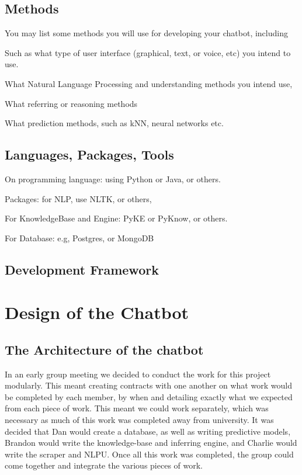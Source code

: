 \documentclass[11pt]{article}
\begin{document}
	\subsection{Methods}
	
	You may list some methods you will use for developing your chatbot, including 
	
	Such as what type of user interface (graphical, text, or voice, etc) you intend to use.
	
	What Natural Language Processing and understanding methods you intend use, 
	
	What referring or reasoning methods
	
	What prediction methods, such as kNN, neural networks etc. 
	
	\subsection{Languages, Packages, Tools}
	
	On programming language: using Python or Java, or others. 
	
	Packages: for NLP, use NLTK\citep{NLTK}, or others, 
	
	For KnowledgeBase and Engine: PyKE or PyKnow, or others. 
	
	For Database: e.g, Postgres, or MongoDB     
	
	\subsection{Development Framework}	
	
	\section{Design of the Chatbot}	 \label {Design}
	
	\subsection{The Architecture of the chatbot}
	In an early group meeting we decided to conduct the work for this project modularly. This meant creating contracts with one another on what work would be completed by each member, by when and detailing exactly what we expected from each piece of work. This meant we could work separately, which was necessary as much of this work was completed away from university. It was decided that Dan would create a database, as well as writing predictive models, Brandon would write the knowledge-base and inferring engine, and Charlie would write the scraper and NLPU. Once all this work was completed, the group could come together and integrate the various pieces of work. 
	
\end{document}

